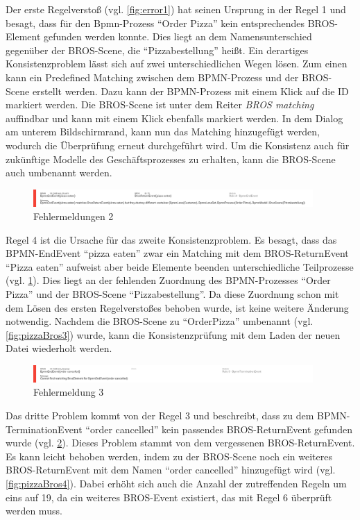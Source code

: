 Der erste Regelverstoß (vgl. \cref{fig:error1}) hat seinen Ursprung in der Regel 1 und besagt, dass für den Bpmn-Prozess ``Order Pizza'' kein entsprechendes BROS-Element gefunden werden konnte.
Dies liegt an dem Namensunterschied gegenüber der BROS-Scene, die ``Pizzabestellung'' heißt.
Ein derartiges Konsistenzproblem lässt sich auf zwei unterschiedlichen Wegen lösen.
Zum einen kann ein Predefined Matching zwischen dem BPMN-Prozess und der BROS-Scene erstellt werden.
Dazu kann der BPMN-Prozess mit einem Klick auf die ID markiert werden.
Die BROS-Scene ist unter dem Reiter \emph{BROS matching} auffindbar und kann mit einem Klick ebenfalls markiert werden.
In dem Dialog am unterem Bildschirmrand, kann nun das Matching hinzugefügt werden, wodurch die Überprüfung erneut durchgeführt wird.
Um die Konsistenz auch für zukünftige Modelle des Geschäftsprozesses zu erhalten, kann die BROS-Scene auch umbenannt werden.

\begin{figure}[H]
    \centering
     \includegraphics[width=0.95\textwidth,keepaspectratio]{../images/example/error2.png}%
    \caption{Fehlermeldungen 2}%
    \label{fig:error2}
\end{figure}

Regel 4 ist die Ursache für das zweite Konsistenzproblem.
Es besagt, dass das BPMN-EndEvent ``pizza eaten'' zwar ein Matching mit dem BROS-ReturnEvent ``Pizza  eaten'' aufweist aber beide Elemente beenden unterschiedliche Teilprozesse (vgl. \cref{fig:error2}).
Dies liegt an der fehlenden Zuordnung des BPMN-Prozesses ``Order Pizza'' und der BROS-Scene ``Pizzabestellung''.
Da diese Zuordnung schon mit dem Lösen des ersten Regelverstoßes behoben wurde, ist keine weitere Änderung notwendig.
Nachdem die BROS-Scene zu ``OrderPizza'' umbenannt (vgl. \cref{fig:pizzaBros3}) wurde, kann die Konsistenzprüfung mit dem Laden der neuen Datei wiederholt werden.

\begin{figure}[H]
    \centering
    \includegraphics[width=0.95\textwidth,keepaspectratio]{../images/example/error3.png}%
    \caption{Fehlermeldung 3}%
    \label{fig:error3}
\end{figure}

Das dritte Problem kommt von der Regel 3 und beschreibt, dass zu dem BPMN-TerminationEvent ``order cancelled'' kein passendes BROS-ReturnEvent gefunden wurde (vgl. \cref{fig:error3}).
Dieses Problem stammt von dem vergessenen BROS-ReturnEvent.
Es kann leicht behoben werden, indem zu der BROS-Scene noch ein weiteres BROS-ReturnEvent mit dem Namen ``order cancelled'' hinzugefügt wird (vgl. \cref{fig:pizzaBros4}). 
Dabei erhöht sich auch die Anzahl der zutreffenden Regeln um eins auf 19, da ein weiteres BROS-Event existiert, das mit Regel 6 überprüft werden muss.

